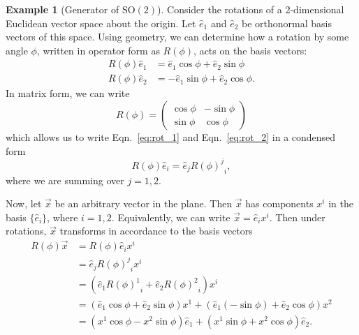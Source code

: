 \documentclass[12pt]{report}
\newcommand{\ehat}{\hat{e}}
\newcommand{\mat}[3]{{{#1}^#2}_#3}
\newcommand{\sotwo}{\textrm{SO}{(2)}}
\theoremstyle{definition}
\newtheorem{example}{Example}[chapter]
\begin{document}
\begin{example}[Generator of $\sotwo$]
    Consider the rotations of a 2-dimensional Euclidean vector space about the origin. Let $\ehat_1$ and $\ehat_2$ be orthonormal basis vectors of this space. Using geometry, we can determine how a rotation by some angle $\phi$, written in operator form as $R(\phi)$, acts on the basis vectors:
    \begin{align}
        R(\phi)\ehat_1 &= \ehat_1\cos\phi + \ehat_2\sin\phi \label{eq:rot_1}\\
        R(\phi)\ehat_2 &= -\ehat_1\sin\phi + \ehat_2\cos\phi.\label{eq:rot_2}
    \end{align}
    In matrix form, we can write
    \begin{equation}
        R(\phi) = 
        \begin{pmatrix}
            \cos\phi & -\sin\phi \\
            \sin\phi & \cos\phi
        \end{pmatrix}
    \end{equation}
    which allows us to write Eqn.~\ref{eq:rot_1} and Eqn.~\ref{eq:rot_2} in a condensed form
    \begin{equation}
        R(\phi)\ehat_i = \ehat_j{{R(\phi)}^j}_i,
    \end{equation}
    where we are summing over $j=1,2$.

    Now, let $\vec{x}$ be an arbitrary vector in the plane. Then $\vec{x}$ has components $x^i$ in the basis $\{\ehat_i\}$, where $i=1,2$. Equivalently, we can write $\vec{x}=\ehat_i x^i$. Then under rotations, $\vec{x}$ transforms in accordance to the basis vectors
    \begin{align}
        R(\phi)\vec{x} &= R(\phi)\ehat_i x^i \label{eq:rot_vec} \\
        &= \ehat_j{{R(\phi)}^j}_i x^i \nonumber \\
        &= \left( \ehat_1\mat{R(\phi)}{1}{i} + \ehat_2\mat{R(\phi)}{2}{i} \right)x^i \nonumber \\
        &= \left( \ehat_1\cos\phi + \ehat_2\sin\phi \right) x^1 + \left( \ehat_1(-\sin\phi) + \ehat_2\cos\phi \right) x^2 \nonumber \\
        &= \left( x^1\cos\phi - x^2\sin\phi \right)\ehat_1 + \left( x^1\sin\phi + x^2\cos\phi \right)\ehat_2.  \nonumber
    \end{align}


\end{example}
\end{document}
